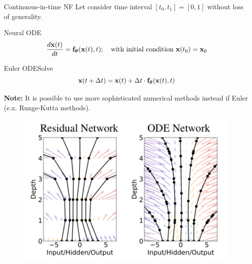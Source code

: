 \begin{frame}{Continuous-in-time NF}
	Let consider time interval $[t_0, t_1] = [0, 1]$ without loss of generality.
	\begin{block}{Neural ODE}
		\vspace{-0.2cm}
		\[
  			\frac{d \mathbf{x}(t)}{dt} = \mathbf{f}_{\boldsymbol{\theta}}(\mathbf{x}(t), t); \quad \text{with initial condition }\mathbf{x}(t_0) = \mathbf{x}_0
		\]
		\vspace{-0.5cm}
	\end{block}
	\begin{block}{Euler ODESolve}
		\vspace{-0.3cm}
		\[
		    \mathbf{x}(t + \Delta t) = \mathbf{x}(t) + \Delta t \cdot \mathbf{f}_{\boldsymbol{\theta}}(\mathbf{x}(t), t)
		\]
		\vspace{-0.3cm}
	\end{block}
	\begin{minipage}[t]{0.45\columnwidth}
		\textbf{Note:} It is possible to use more sophisticated numerical methods instead if Euler (e.x. Runge-Kutta methods).
	\end{minipage}%
	\begin{minipage}[t]{0.55\columnwidth}
		\vspace{-0.5cm}
		\begin{figure}
			\centering
			\includegraphics[width=\linewidth]{figs/resnet_vs_neural_ode}
		\end{figure}
	\end{minipage}
	

\end{frame}
